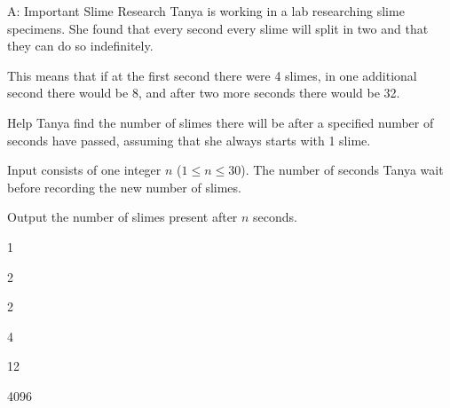 \begin{problem}{A: Important Slime Research}
Tanya is working in a lab researching slime specimens. She found that every second every slime will split in two and that they can do so indefinitely.

This means that if at the first second there were 4 slimes, in one additional second there would be 8, and after two more seconds there would be 32.

Help Tanya find the number of slimes there will be after a specified number of seconds have passed, assuming that she always starts with 1 slime. 
\end{problem}

\begin{formalin}
Input consists of one integer $n$ ($1 \leq n \leq 30$). The number of seconds Tanya wait before recording the new number of slimes.
\end{formalin}

\begin{formalout}
Output the number of slimes present after $n$ seconds.
\end{formalout}

\begin{datain}
1
\end{datain}
\begin{dataout}
2
\end{dataout}

\begin{datain}
2
\end{datain}
\begin{dataout}
4
\end{dataout}

\begin{datain}
12
\end{datain}
\begin{dataout}
4096
\end{dataout}

